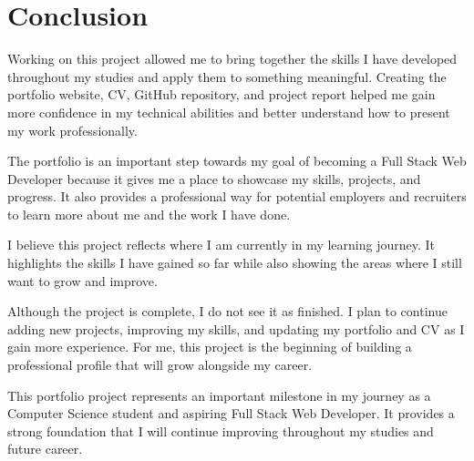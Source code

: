 \documentclass[12pt,a4paper]{article}
\begin{document}
\section{Conclusion}

Working on this project allowed me to bring together the skills I have developed throughout my studies and apply them to something meaningful. Creating the portfolio website, CV, GitHub repository, and project report helped me gain more confidence in my technical abilities and better understand how to present my work professionally.

The portfolio is an important step towards my goal of becoming a Full Stack Web Developer because it gives me a place to showcase my skills, projects, and progress. It also provides a professional way for potential employers and recruiters to learn more about me and the work I have done.

I believe this project reflects where I am currently in my learning journey. It highlights the skills I have gained so far while also showing the areas where I still want to grow and improve.

Although the project is complete, I do not see it as finished. I plan to continue adding new projects, improving my skills, and updating my portfolio and CV as I gain more experience. For me, this project is the beginning of building a professional profile that will grow alongside my career.

\begin{tcolorbox}[
colback=KimPink!5,
colframe=KimPink,
title=Final Reflection]

This portfolio project represents an important milestone in my journey as a Computer Science student and aspiring Full Stack Web Developer. It provides a strong foundation that I will continue improving throughout my studies and future career.

\end{tcolorbox}
\end{document}

